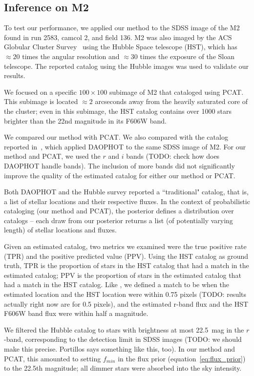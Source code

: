 \subsection{Inference on M2}
To test our performance, we applied our method to the SDSS image of the M2 found in run 2583, camcol 2, and field 136.
M2 was also imaged by the ACS Globular Cluster Survey~\cite{Sarajedini_2007}
using the Hubble Space telescope (HST),
which has $\approx20$ times the angular resolution and $\approx30$ times the exposure of the Sloan telescope. The reported catalog using the Hubble images was used to 
validate our results. 

We focused on a specific $100 \times 100$ subimage of M2 that \cite{Portillo_2017, Feder_2019} cataloged using PCAT.
This subimage is located $\approx2$ arcseconds away from the heavily saturated core of the cluster;
even in this subimage, the HST catalog contains over 1000 stars brighter than the 22nd magnitude in its F606W band.

We compared our method with PCAT. We also compared with the catalog reported in~\cite{An_2008_m2}, which applied DAOPHOT to the same SDSS image of M2. 
For our method and PCAT, we used the $r$ and $i$ bands (TODO: check how does DAOPHOT handle bands). The inclusion of more bands did not significantly improve the quality of the estimated catalog for either our method or PCAT. 

Both DAOPHOT and the Hubble survey reported a ``traditional" catalog, that is, a list of stellar locations and their respective fluxes. In the context of probabilistic cataloging (our method and PCAT), the posterior 
defines a distribution over catalogs -- each draw from our posterior returns a list (of potentially varying length) of stellar locations and fluxes. 

Given an estimated catalog, two metrics we examined were the true positive rate (TPR) and the positive predicted value (PPV). Using the HST catalog as ground truth, TPR is the proportion of stars in the HST catalog that had a match in the estimated catalog;
PPV is the proportion of stars in the estimated catalog that had a match in the HST catalog. Like \cite{Portillo_2017, Feder_2019}, we defined a match to be when the estimated location and the HST location were within 0.75 pixels
(TODO: results actually right now are for 0.5 pixels),
and the estimated r-band flux and the HST F606W band flux were within half a magnitude.

We filtered the Hubble catalog to stars with brightness at most 22.5~mag in the $r$-band, corresponding to the detection limit in SDSS images  
(TODO: we should make this precise. Portillos says something like this, too). In our method and PCAT, this amounted to setting $f_{min}$ in the flux prior (equation~\eqref{eq:flux_prior})
to the 22.5th magnitude; all dimmer stars were absorbed into the sky intensity. 

